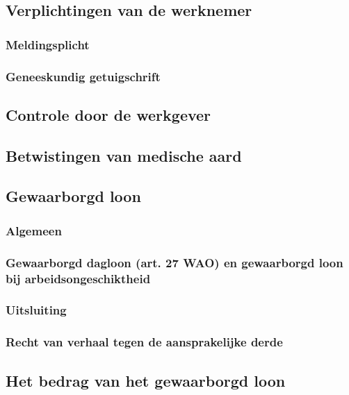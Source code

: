 \subsection{Verplichtingen van de werknemer}

\subsubsection{Meldingsplicht}

\subsubsection{Geneeskundig getuigschrift}

\subsection{Controle door de werkgever}

\subsection{Betwistingen van medische aard}

\subsection{Gewaarborgd loon}

\subsubsection{Algemeen}

\subsubsection{Gewaarborgd dagloon (art. 27 WAO) en gewaarborgd loon bij arbeidsongeschiktheid}

\subsubsection{Uitsluiting}

\subsubsection{Recht van verhaal tegen de aansprakelijke derde}

\subsection{Het bedrag van het gewaarborgd loon}


